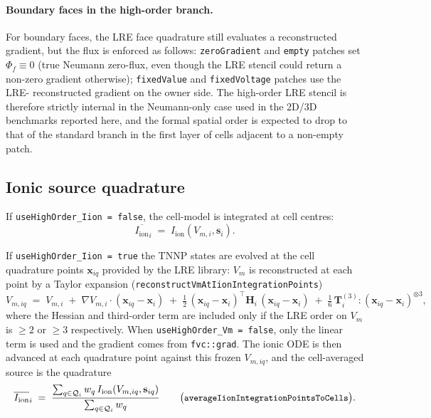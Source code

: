 \documentclass[11pt,a4paper]{article}
\newcommand{\Vm}{V_{m}}
\newcommand{\Vmsub}[1]{V_{m,#1}}
\newcommand{\Iion}{I_{\text{ion}}}
\newcommand{\grad}{\nabla}
\newcommand{\code}[1]{\texttt{\small #1}}
\begin{document}
\paragraph{Boundary faces in the high-order branch.}
For boundary faces, the LRE face quadrature still evaluates a
reconstructed gradient, but the flux is enforced as follows:
\code{zeroGradient} and \code{empty} patches set
$\Phi_{f} \equiv 0$ (true Neumann zero-flux, even though the LRE
stencil could return a non-zero gradient otherwise);
\code{fixedValue} and \code{fixedVoltage} patches use the LRE-
reconstructed gradient on the owner side. The high-order LRE stencil
is therefore strictly internal in the Neumann-only case used in the
2D/3D benchmarks reported here, and the formal spatial order is
expected to drop to that of the standard branch in the first layer
of cells adjacent to a non-empty patch.

\subsection{Ionic source quadrature}
\label{sec:hoIion}

If \code{useHighOrder\_Iion = false}, the cell-model is integrated
at cell centres:
\begin{equation}
  \overline{\Iion}_{i}
   \;=\; \Iion(\Vmsub{i}, \mathbf{s}_{i}).
\end{equation}

If \code{useHighOrder\_Iion = true} the TNNP states are evolved at
the cell quadrature points $\mathbf{x}_{iq}$ provided by the LRE
library: $\Vm$ is reconstructed at each point by a Taylor expansion
(\code{reconstructVmAtIionIntegrationPoints})
\begin{equation}
  \Vmsub{iq}
   \;=\;
   \Vmsub{i}
   \;+\;
   \grad\Vmsub{i}\cdot(\mathbf{x}_{iq} - \mathbf{x}_{i})
   \;+\;
   \tfrac{1}{2}\,(\mathbf{x}_{iq} - \mathbf{x}_{i})^{\!\top}\!
   \mathbf{H}_{i}\,(\mathbf{x}_{iq} - \mathbf{x}_{i})
   \;+\;
   \tfrac{1}{6}\,\mathbf{T}^{(3)}_{i}\!:\!(\mathbf{x}_{iq} - \mathbf{x}_{i})^{\otimes 3},
\end{equation}
where the Hessian and third-order term are included only if the LRE
order on $\Vm$ is $\ge 2$ or $\ge 3$ respectively. When
\code{useHighOrder\_Vm = false}, only the linear term is used and
the gradient comes from \code{fvc::grad}. The ionic ODE is then
advanced at each quadrature point against this frozen $\Vmsub{iq}$,
and the cell-averaged source is the quadrature
\begin{equation}
  \overline{\Iion}_{i}
   \;=\;
   \frac{\sum_{q \in \mathcal{Q}_{i}} w_{q}\,\Iion(\Vmsub{iq},\mathbf{s}_{iq})}
        {\sum_{q \in \mathcal{Q}_{i}} w_{q}}
   \qquad
   \bigl(\text{\code{averageIionIntegrationPointsToCells}}\bigr).
   \label{eq:iion-quad}
\end{equation}
\end{document}
